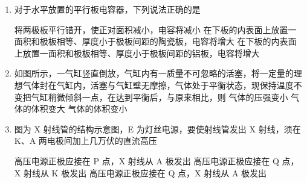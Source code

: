 \documentclass[\gkver]{gaokaozhenti}
\begin{document}
\begin{enumerate}

\item
对于水平放置的平行板电容器，下列说法正确的是 

{将两极板平行错开，使正对面积减小，电容将减小}
{在下板的内表面上放置一面积和极板相等、厚度小于极板间距的陶瓷板，电容将增大}
{在下板的内表面上放置一面积和极板相等、厚度小于极板间距的铝板，电容将增大}


\item
如图所示，一气缸竖直倒放，气缸内有一质量不可忽略的活塞，将一定量的理想气体封在气缸内，活塞与气缸壁无摩擦，气体处于平衡状态，现保持温度不变把气缸稍微倾斜一点，在达到平衡后，与原来相比，则 
\onepicture[w=2.47cm]{}
{气体的压强变小}
{气体的体积变大}
{气体的体积变小}


\item
图为 X 射线管的结构示意图，E 为灯丝电源，要使射线管发出 X 射线，须在 K、A 两电极间加上几万伏的直流高压 

{高压电源正极应接在 P 点，X 射线从 A 极发出}
{高压电源正极应接在 Q 点，X 射线从 K 极发出}
{高压电源正极应接在 Q 点，X 射线从 A 极发出}



\end{enumerate}
\end{document}
